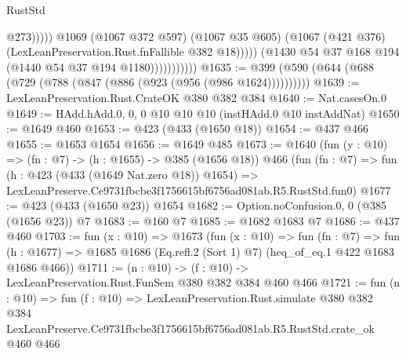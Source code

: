 \begin{lexlean}{RustStd}
\begin{coremodule}
                                      @273)))))
                            @1069
                            (@1067 @372 @597)
                            (@1067 @35 @605)
                            (@1067 (@421 @376) (LexLeanPreservation.Rust.fnFallible @382 @18)))))
                      (@1430 @54 @37 @168 @194 (@1440 @54 @37 @194 @1180)))))))))))
@1635 := @399 (@590 (@644 (@688 (@729 (@788 (@847 (@886 (@923 (@956 (@986 @1624))))))))))
@1639 := LexLeanPreservation.Rust.CrateOK @380 @382 @384
@1640 := Nat.casesOn.{0}
@1649 := HAdd.hAdd.{0, 0, 0} @10 @10 @10 (instHAdd.{0} @10 instAddNat)
@1650 := @1649 @460
@1653 := @423 (@433 (@1650 @18))
@1654 := @437 @466
@1655 := @1653 @1654
@1656 := @1649 @485
@1673 := @1640
    (fun (y : @10) => (fn : @7) -> (h : @1655) -> @385 (@1656 @18))
    @466
    (fun (fn : @7) =>
    fun (h : @423 (@433 (@1649 Nat.zero @18)) @1654) =>
    LexLeanPreserve.Ce9731fbcbe3f1756615bf6756ad081ab.R5.RustStd.fun0)
@1677 := @423 (@433 (@1650 @23)) @1654
@1682 := Option.noConfusion.{0, 0} (@385 (@1656 @23)) @7
@1683 := @160 @7
@1685 := @1682 @1683 @7
@1686 := @437 @460
@1703 := fun (x : @10) =>
  @1673
    (fun (x : @10) =>
    fun (fn : @7) =>
    fun (h : @1677) => @1685 @1686 (Eq.refl.{2} (Sort 1) @7) (heq_of_eq.{1} @422 @1683 @1686 @466))
@1711 := (n : @10) -> (f : @10) -> LexLeanPreservation.Rust.FunSem @380 @382 @384 @460 @466
@1721 := fun (n : @10) =>
  fun (f : @10) =>
  LexLeanPreservation.Rust.simulate
    @380
    @382
    @384
    LexLeanPreserve.Ce9731fbcbe3f1756615bf6756ad081ab.R5.RustStd.crate_ok
    @460
    @466
\end{coremodule}
\end{lexlean}
